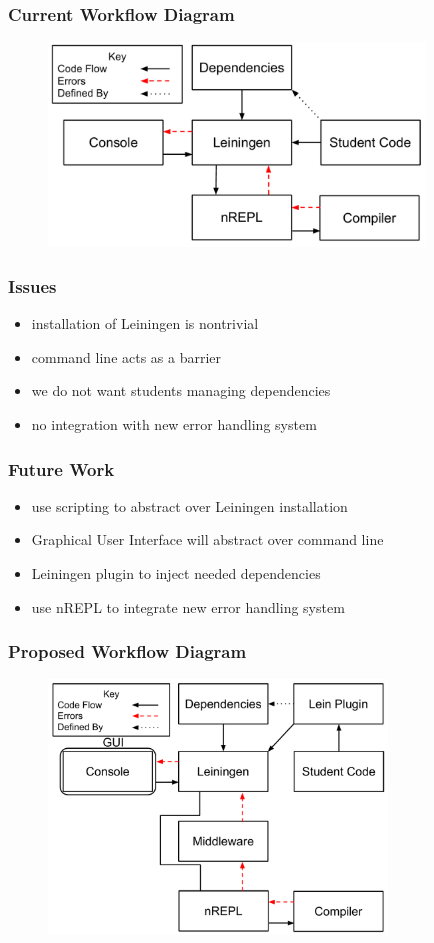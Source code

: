 \documentclass{beamer}
\begin{document}
\begin{frame}[fragile]
\frametitle{Current Workflow Diagram}
\begin{figure}[h]
 \includegraphics[width=10cm]{../CurrentErrorHandling.pdf}
 \centering
\end{figure}
\end{frame}

\begin{frame}
\frametitle{Issues}
	\begin{itemize}
		\item installation of Leiningen is nontrivial
		\item command line acts as a barrier
		\item we do not want students managing dependencies
		\item no integration with new error handling system
	\end{itemize} 
\end{frame}

\begin{frame}
\frametitle{Future Work}
	\begin{itemize}
		\item use scripting to abstract over Leiningen installation
		\item Graphical User Interface will abstract over command line
		\item Leiningen plugin to inject needed dependencies
		\item use nREPL to integrate new error handling system
	\end{itemize}
\end{frame}

\begin{frame}[fragile]
\frametitle{Proposed Workflow Diagram}
\begin{figure}[h]
 \includegraphics[width=9cm]{../OurErrorHandlingSystem.pdf}
 \centering
\end{figure}
\end{frame}
\end{document}
